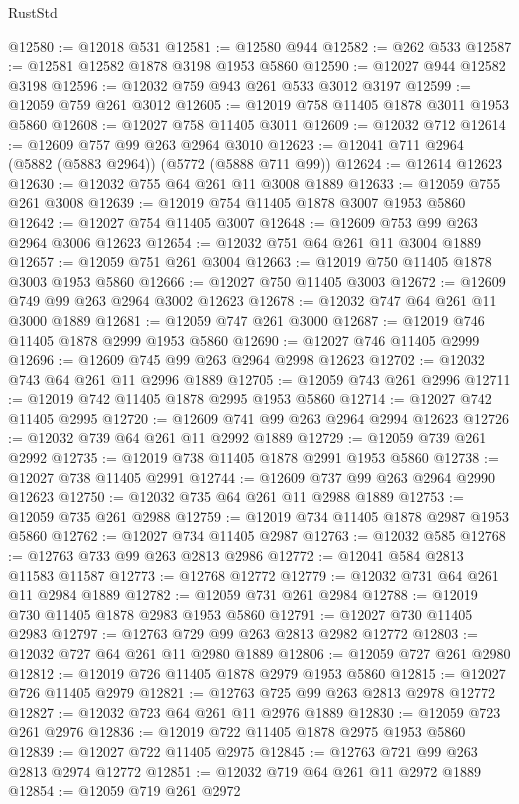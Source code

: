 \begin{lexlean}{RustStd}
\begin{coremodule}
{\begin{coremodule}
{{{{{{{{{{{{{{{{{{{{{{{{{{{{{@12580 := @12018 @531
@12581 := @12580 @944
@12582 := @262 @533
@12587 := @12581 @12582 @1878 @3198 @1953 @5860
@12590 := @12027 @944 @12582 @3198
@12596 := @12032 @759 @943 @261 @533 @3012 @3197
@12599 := @12059 @759 @261 @3012
@12605 := @12019 @758 @11405 @1878 @3011 @1953 @5860
@12608 := @12027 @758 @11405 @3011
@12609 := @12032 @712
@12614 := @12609 @757 @99 @263 @2964 @3010
@12623 := @12041 @711 @2964 (@5882 (@5883 @2964)) (@5772 (@5888 @711 @99))
@12624 := @12614 @12623
@12630 := @12032 @755 @64 @261 @11 @3008 @1889
@12633 := @12059 @755 @261 @3008
@12639 := @12019 @754 @11405 @1878 @3007 @1953 @5860
@12642 := @12027 @754 @11405 @3007
@12648 := @12609 @753 @99 @263 @2964 @3006 @12623
@12654 := @12032 @751 @64 @261 @11 @3004 @1889
@12657 := @12059 @751 @261 @3004
@12663 := @12019 @750 @11405 @1878 @3003 @1953 @5860
@12666 := @12027 @750 @11405 @3003
@12672 := @12609 @749 @99 @263 @2964 @3002 @12623
@12678 := @12032 @747 @64 @261 @11 @3000 @1889
@12681 := @12059 @747 @261 @3000
@12687 := @12019 @746 @11405 @1878 @2999 @1953 @5860
@12690 := @12027 @746 @11405 @2999
@12696 := @12609 @745 @99 @263 @2964 @2998 @12623
@12702 := @12032 @743 @64 @261 @11 @2996 @1889
@12705 := @12059 @743 @261 @2996
@12711 := @12019 @742 @11405 @1878 @2995 @1953 @5860
@12714 := @12027 @742 @11405 @2995
@12720 := @12609 @741 @99 @263 @2964 @2994 @12623
@12726 := @12032 @739 @64 @261 @11 @2992 @1889
@12729 := @12059 @739 @261 @2992
@12735 := @12019 @738 @11405 @1878 @2991 @1953 @5860
@12738 := @12027 @738 @11405 @2991
@12744 := @12609 @737 @99 @263 @2964 @2990 @12623
@12750 := @12032 @735 @64 @261 @11 @2988 @1889
@12753 := @12059 @735 @261 @2988
@12759 := @12019 @734 @11405 @1878 @2987 @1953 @5860
@12762 := @12027 @734 @11405 @2987
@12763 := @12032 @585
@12768 := @12763 @733 @99 @263 @2813 @2986
@12772 := @12041 @584 @2813 @11583 @11587
@12773 := @12768 @12772
@12779 := @12032 @731 @64 @261 @11 @2984 @1889
@12782 := @12059 @731 @261 @2984
@12788 := @12019 @730 @11405 @1878 @2983 @1953 @5860
@12791 := @12027 @730 @11405 @2983
@12797 := @12763 @729 @99 @263 @2813 @2982 @12772
@12803 := @12032 @727 @64 @261 @11 @2980 @1889
@12806 := @12059 @727 @261 @2980
@12812 := @12019 @726 @11405 @1878 @2979 @1953 @5860
@12815 := @12027 @726 @11405 @2979
@12821 := @12763 @725 @99 @263 @2813 @2978 @12772
@12827 := @12032 @723 @64 @261 @11 @2976 @1889
@12830 := @12059 @723 @261 @2976
@12836 := @12019 @722 @11405 @1878 @2975 @1953 @5860
@12839 := @12027 @722 @11405 @2975
@12845 := @12763 @721 @99 @263 @2813 @2974 @12772
@12851 := @12032 @719 @64 @261 @11 @2972 @1889
@12854 := @12059 @719 @261 @2972
}}}}}}}}}}}}}}}}}}}}}}}}}}}}}
\end{coremodule}}
\end{coremodule}
\end{lexlean}
